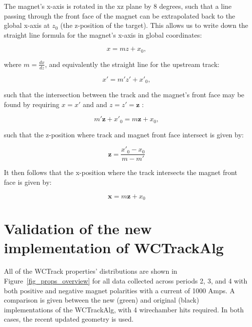  
 The magnet's x-axis is rotated in the xz plane by 8 degrees, such that a line passing through the front face of the magnet can be extrapolated back to the global x-axis at $z_0$ (the z-position of the target). This allows us to write down the straight line formula for the magnet's x-axis in global coordinates:
 
 \begin{equation}
 x = m  z + x_0,
 \end{equation} 
 
where $m = \frac{dx}{dz}$, and equivalently the straight line for the upstream track:
 
 \begin{equation}
 x' = m' z' + x'_0,
 \end{equation} 
 
 such that the intersection between the track and the magnet's front face may be found by requiring $x = x'$  and and $z = z' = \textbf{z}$ :
 
  \begin{equation}
m' \textbf{z} + x'_0 = m \textbf{z} + x_0,
 \end{equation} 

such that the z-position where track and magnet front face intersect is given by:

  \begin{equation}
\textbf{z} = \frac{ x'_0 - x_0 }{ m - m'}
  \end{equation}
 
 It then follows that the x-position where the track intersects the magnet front face is given by:
 
   \begin{equation}
\textbf{x} = m \textbf{z} + x_0
  \end{equation}
 
 
 
   \newpage
  \section{Validation of the new implementation of WCTrackAlg}
  
  All of the WCTrack properties' distributions are shown in Figure~\ref{fig_props_overview} for all data collected across periods 2, 3, and 4 with both positive and negative magnet polarities with a current of 1000 Amps. A comparison is given between the new (green) and original (black) implementations of the WCTrackAlg, with 4 wirechamber hits required. In both cases, the recent updated geometry is used. 
  
